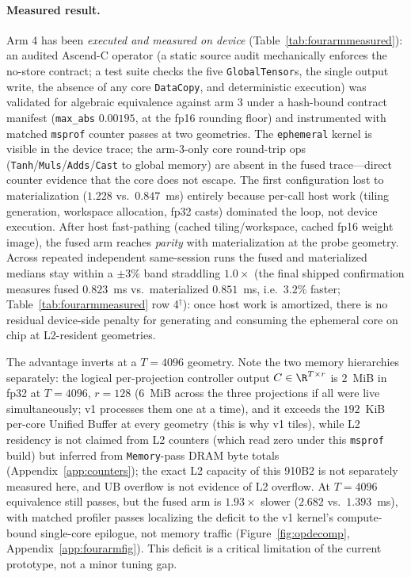 \paragraph{Measured result.}
Arm 4 has been \emph{executed and measured on device}
(Table~\ref{tab:fourarmmeasured}): an audited Ascend-C operator (a static
source audit mechanically enforces the no-store contract; a test suite checks
the five \texttt{GlobalTensor}s, the single output write, the absence of any
core \texttt{DataCopy}, and deterministic execution) was validated for
algebraic equivalence against arm 3 under a hash-bound contract manifest
(\texttt{max\_abs} $0.00195$, at the fp16 rounding floor) and instrumented
with matched \texttt{msprof} counter passes at two geometries. The
\texttt{ephemeral} kernel is visible in the device trace; the arm-3-only core
round-trip ops (\texttt{Tanh}/\texttt{Muls}/\texttt{Adds}/\texttt{Cast} to
global memory) are absent in the fused trace---direct counter evidence that
the core does not escape. The first configuration lost to materialization
($1.228$ vs.\ $0.847$~ms) entirely because per-call host work (tiling
generation, workspace allocation, fp32 casts) dominated the loop, not device
execution. After host fast-pathing (cached tiling/workspace, cached fp16
weight image), the fused arm reaches \emph{parity} with materialization at
the probe geometry. Across repeated independent same-session runs the fused
and materialized medians stay within a $\pm3\%$ band straddling $1.0\times$
(the final shipped confirmation measures fused $0.823$~ms vs.\ materialized
$0.851$~ms, i.e.\ $3.2\%$ faster; Table~\ref{tab:fourarmmeasured} row
4$^\dagger$): once host work is amortized, there is no residual device-side
penalty for generating and consuming the ephemeral core on chip at
L2-resident geometries.

The advantage inverts at a $T{=}4096$ geometry.  Note the two memory
hierarchies separately: the logical per-projection controller output
$C\in\R^{T\times r}$ is $2$~MiB in fp32 at $T{=}4096$, $r{=}128$ ($6$~MiB
across the three projections if all were live simultaneously; v1 processes
them one at a time), and it exceeds the $192$~KiB
per-core Unified Buffer at every geometry (this is why v1 tiles), while
L2 residency is not claimed from L2 counters (which read zero under this
\texttt{msprof} build) but inferred from \texttt{Memory}-pass DRAM byte
totals (Appendix~\ref{app:counters}); the exact L2 capacity of this
910B2 is not separately measured here, and UB overflow is not evidence
of L2 overflow.  At $T{=}4096$ equivalence still
passes, but the fused arm is $1.93\times$ slower
($2.682$ vs.\ $1.393$~ms), with matched profiler passes localizing the
deficit to the v1 kernel's compute-bound single-core epilogue, not memory
traffic (Figure~\ref{fig:opdecomp}, Appendix~\ref{app:fourarmfig}).  This
deficit is a critical limitation of the current prototype, not a minor
tuning gap.

